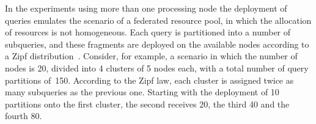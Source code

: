 In the experiments using more than one processing node the deployment of
queries emulates the scenario of a federated resource pool, in which the allocation of resources
is not homogeneous. Each query is partitioned into a number of subqueries, and these fragments are
deployed on the available nodes according to a Zipf distribution~\cite{zipf}. Consider, for example,
a scenario in which the number of nodes is 20, divided into 4 clusters of 5 nodes each, with a total
number of query partitions of~150. According to the Zipf law, each cluster is assigned twice as many
subqueries as the previous one. Starting with the deployment of 10 partitions onto the first cluster, the
second receives 20, the third 40 and the fourth 80. 

% 
%  

